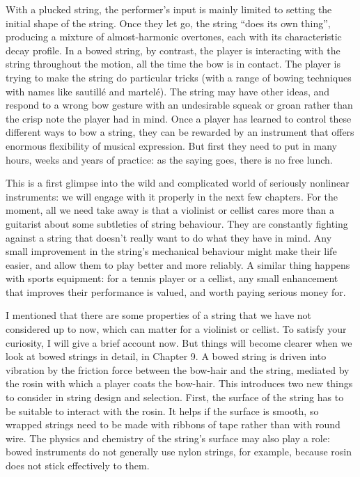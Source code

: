   With a plucked string, the performer’s input is mainly limited to setting the 
  initial shape of the string. Once they let go, the string “does its own 
  thing”, producing a mixture of almost-harmonic overtones, each with its 
  characteristic decay profile. In a bowed string, by contrast, the player is 
  interacting with the string throughout the motion, all the time the bow is in 
  contact. The player is trying to make the string do particular tricks (with a 
  range of bowing techniques with names like sautillé and martelé). The string 
  may have other ideas, and respond to a wrong bow gesture with an undesirable 
  squeak or groan rather than the crisp note the player had in mind. Once a 
  player has learned to control these different ways to bow a string, they can 
  be rewarded by an instrument that offers enormous flexibility of musical 
  expression. But first they need to put in many hours, weeks and years of 
  practice: as the saying goes, there is no free lunch. 

  This is a first glimpse into the wild and complicated world of seriously 
  nonlinear instruments: we will engage with it properly in the next few 
  chapters. For the moment, all we need take away is that a violinist or 
  cellist cares more than a guitarist about some subtleties of string 
  behaviour. They are constantly fighting against a string that doesn’t really 
  want to do what they have in mind. Any small improvement in the string’s 
  mechanical behaviour might make their life easier, and allow them to play 
  better and more reliably. A similar thing happens with sports equipment: for 
  a tennis player or a cellist, any small enhancement that improves their 
  performance is valued, and worth paying serious money for. 

  I mentioned that there are some properties of a string that we have not 
  considered up to now, which can matter for a violinist or cellist. To satisfy 
  your curiosity, I will give a brief account now. But things will become 
  clearer when we look at bowed strings in detail, in Chapter 9. A bowed string 
  is driven into vibration by the friction force between the bow-hair and the 
  string, mediated by the rosin with which a player coats the bow-hair. This 
  introduces two new things to consider in string design and selection. First, 
  the surface of the string has to be suitable to interact with the rosin. It 
  helps if the surface is smooth, so wrapped strings need to be made with 
  ribbons of tape rather than with round wire. The physics and chemistry of the 
  string's surface may also play a role: bowed instruments do not generally use 
  nylon strings, for example, because rosin does not stick effectively to them. 

